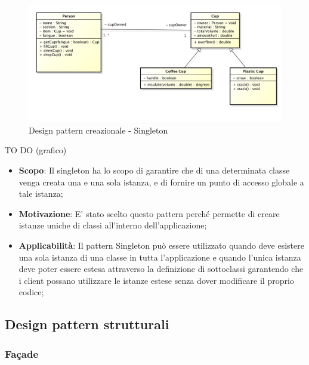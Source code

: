 		\begin{figure}[htbp]
			\centering
			\centerline{\includegraphics[scale=0.3]{./images/example_graph.png}}
			\caption{Design pattern creazionale - Singleton}
		\end{figure}
		TO DO (grafico)
		
		
		\begin{itemize}
			\item \textbf{Scopo}: Il singleton ha lo scopo di garantire che di una determinata classe venga creata una e una sola istanza, e di fornire un punto di accesso globale a tale istanza;
						
			\item \textbf{Motivazione}: E' stato scelto questo pattern perché permette di creare istanze uniche di classi all'interno dell'applicazione;
			
			\item \textbf{Applicabilità}: Il pattern Singleton può essere utilizzato quando deve esistere una sola istanza di una classe in tutta l'applicazione e quando l'unica istanza deve poter essere estesa attraverso la definizione di sottoclassi garantendo che i client possano utilizzare le istanze estese senza dover modificare il proprio codice;
		\end{itemize}
		



	\clearpage 
	\newpage
	\subsection{Design pattern strutturali} %
		\subsubsection{Fa\c{c}ade} %
		
